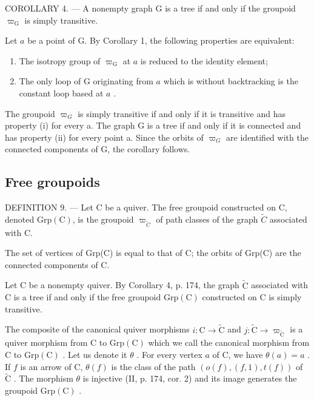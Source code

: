 COROLLARY 4. --- A nonempty graph G is a tree if and only if the groupoid \(\varpi_{\mathrm{G}}\) is simply transitive.

Let \(a\) be a point of G. By Corollary 1, the following properties are equivalent:

\begin{enumerate}
\def\labelenumi{(\roman{enumi})}
\item
  The isotropy group of \(\varpi_{\mathrm{G}}\) at \(a\) is reduced to the identity element;
\item
  The only loop of G originating from \(a\) which is without backtracking is the constant loop based at \(a\) .
\end{enumerate}

The groupoid \(\varpi_{G}\) is simply transitive if and only if it is transitive and has property (i) for every a. The graph G is a tree if and only if it is connected and has property (ii) for every point a. Since the orbits of \(\varpi_{G}\) are identified with the connected components of G, the corollary follows.

\subsection{Free groupoids}

DEFINITION 9. --- Let C be a quiver. The free groupoid constructed on C, denoted \(\mathrm{Grp}(\mathrm{C})\), is the groupoid \(\varpi_{\widetilde{C}}\) of path classes of the graph \(\widetilde{C}\) associated with C.

The set of vertices of Grp(C) is equal to that of C; the orbits of Grp(C) are the connected components of C.

Let C be a nonempty quiver. By Corollary 4, p. 174, the graph \(\widetilde{\mathrm{C}}\) associated with C is a tree if and only if the free groupoid \(\mathrm{Grp}(\mathrm{C})\) constructed on C is simply transitive.

The composite of the canonical quiver morphisms \(i\colon \mathrm{C}\to \widetilde{\mathrm{C}}\) and \(j\colon \widetilde{\mathrm{C}}\to \varpi_{\widetilde{\mathrm{C}}}\) is a quiver morphism from C to \(\mathrm{Grp}(\mathrm{C})\) which we call the canonical morphism from C to \(\mathrm{Grp}(\mathrm{C})\) . Let us denote it \(\theta\) . For every vertex \(a\) of C, we have \(\theta (a) = a\) . If \(f\) is an arrow of C, \(\theta (f)\) is the class of the path \((o(f),(f,1),t(f))\) of \(\widetilde{\mathrm{C}}\) . The morphism \(\theta\) is injective (II, p. 174, cor. 2) and its image generates the groupoid \(\mathrm{Grp}(\mathrm{C})\) .

